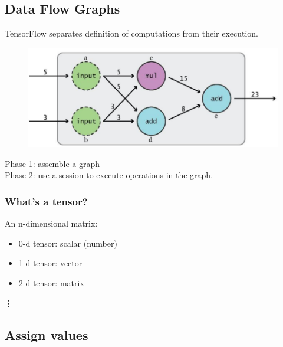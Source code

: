 \documentclass{article}
\begin{document}
	\subsection{Data Flow Graphs}
		TensorFlow separates definition of computations from their execution.
		\begin{figure}[H]
  			\centering
    		\includegraphics[width=0.7\linewidth]{dfg.png}
		\end{figure}
		\noindent Phase 1: assemble a graph\\
		Phase 2: use a session to execute operations in the graph.
		\subsubsection*{What's a tensor?}
		An n-dimensional matrix:
		\begin{itemize}[noitemsep,nolistsep]
			\item 0-d tensor: scalar (number)
			\item 1-d tensor: vector
			\item 2-d tensor: matrix
		\end{itemize}
		\indent\indent\indent\vdots
	\medskip
	\subsection{Assign values}
\end{document}
